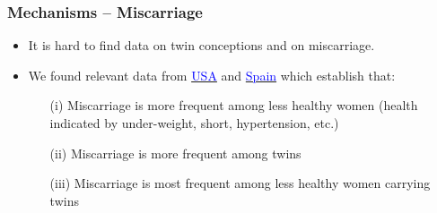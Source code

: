\documentclass[9pt,letterpaper,subeqn]{beamer}
\begin{document}



\begin{frame}[label=mech]
\frametitle{Mechanisms -- Miscarriage}
\begin{itemize}
\item It is hard to find data on twin conceptions and on miscarriage. 
\item We found relevant data from \hyperlink{TwinDeathUSA}{\textcolor{blue}{USA}} and \hyperlink{TwinDeathSpain}{\textcolor{blue}{Spain}} which establish that:
\begin{enumerate}
\item[(i)] Miscarriage is more frequent among less healthy women (health indicated by under-weight, short, hypertension, etc.)
\item[(ii)] Miscarriage is more frequent among twins
\item[(iii)] Miscarriage is most frequent among less healthy women carrying twins
\end{enumerate}
\end{itemize}
\end{frame}
\end{document}

